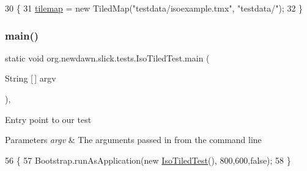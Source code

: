 \begin{DoxyCode}
30                                                                     \{
31         \mbox{\hyperlink{classorg_1_1newdawn_1_1slick_1_1tests_1_1_iso_tiled_test_a50c678a4d5ae115e8b9c76363c127aab}{tilemap}} = \textcolor{keyword}{new} TiledMap(\textcolor{stringliteral}{"testdata/isoexample.tmx"}, \textcolor{stringliteral}{"testdata/"});
32     \}
\end{DoxyCode}
\mbox{\label{classorg_1_1newdawn_1_1slick_1_1tests_1_1_iso_tiled_test_a4acd878cac3be46beeab2c9b38f936fa}} 
\subsubsection{\texorpdfstring{main()}{main()}}
{\footnotesize\ttfamily static void org.\+newdawn.\+slick.\+tests.\+Iso\+Tiled\+Test.\+main (\begin{DoxyParamCaption}\item[{String \mbox{[}$\,$\mbox{]}}]{argv }\end{DoxyParamCaption})\hspace{0.3cm}{\ttfamily [inline]}, {\ttfamily [static]}}

Entry point to our test


\begin{DoxyParams}{Parameters}
{\em argv} & The arguments passed in from the command line \\
\hline
\end{DoxyParams}

\begin{DoxyCode}
56                                            \{
57         Bootstrap.runAsApplication(\textcolor{keyword}{new} \mbox{\hyperlink{classorg_1_1newdawn_1_1slick_1_1tests_1_1_iso_tiled_test_a270d6b6e63f7271a1caa8cdccb269fe2}{IsoTiledTest}}(), 800,600,\textcolor{keyword}{false});
58     \}
\end{DoxyCode}
\mbox{\label{classorg_1_1newdawn_1_1slick_1_1tests_1_1_iso_tiled_test_acb71682241acddc073e360cedff8c4f5}} 

